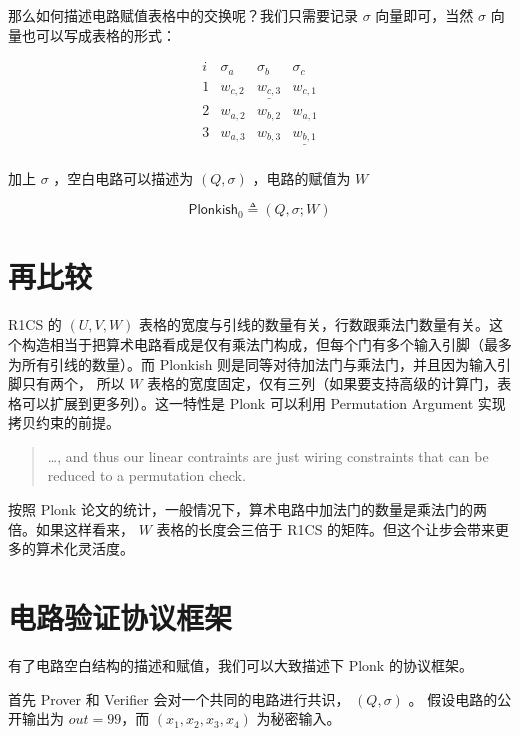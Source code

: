 那么如何描述电路赋值表格中的交换呢？我们只需要记录 \(\sigma\)
向量即可，当然 \(\sigma\) 向量也可以写成表格的形式：

\[
\begin{array}{c|c|c|c|}
i & \sigma_a & \sigma_b & \sigma_c  \\
\hline
1 & \boxed{w_{c,2}} & \underline{w_{c,3}}& w_{c,1} \\
2 & w_{a,2} & w_{b,2} & \boxed{w_{a,1}} \\
3 & w_{a,3} & w_{b,3} & \underline{w_{b,1}} \\
\end{array}
\]

加上 \(\sigma\) ，空白电路可以描述为 \((Q,\sigma)\) ，电路的赋值为 \(W\)

\[
\mathsf{Plonkish}_0 \triangleq (Q, \sigma; W)
\]

\hypertarget{ux518dux6bd4ux8f83}{%
\section{再比较}\label{ux518dux6bd4ux8f83}}

R1CS 的 \((U,V,W)\)
表格的宽度与引线的数量有关，行数跟乘法门数量有关。这个构造相当于把算术电路看成是仅有乘法门构成，但每个门有多个输入引脚（最多为所有引线的数量）。而
Plonkish 则是同等对待加法门与乘法门，并且因为输入引脚只有两个， 所以
\(W\)
表格的宽度固定，仅有三列（如果要支持高级的计算门，表格可以扩展到更多列）。这一特性是
Plonk 可以利用 Permutation Argument 实现拷贝约束的前提。

\begin{quote}
\ldots, and thus our linear contraints are just wiring constraints that
can be reduced to a permutation check.
\end{quote}

按照 Plonk
论文的统计，一般情况下，算术电路中加法门的数量是乘法门的两倍。如果这样看来，
\(W\) 表格的长度会三倍于 R1CS
的矩阵。但这个让步会带来更多的算术化灵活度。

\hypertarget{ux7535ux8defux9a8cux8bc1ux534fux8baeux6846ux67b6}{%
\section{电路验证协议框架}\label{ux7535ux8defux9a8cux8bc1ux534fux8baeux6846ux67b6}}

有了电路空白结构的描述和赋值，我们可以大致描述下 Plonk 的协议框架。

首先 Prover 和 Verifier 会对一个共同的电路进行共识， \((Q,\sigma)\) 。
假设电路的公开输出为 \(out=99\)，而 \((x_1,x_2,x_3,x_4)\) 为秘密输入。

